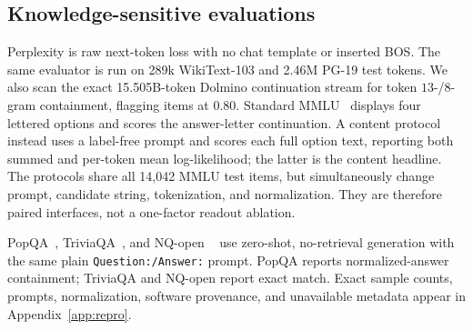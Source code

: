 \subsection{Knowledge-sensitive evaluations}
Perplexity is raw next-token loss with no chat template or inserted BOS.
The same evaluator is run on 289k WikiText-103 and 2.46M PG-19 test tokens.
We also scan the exact 15.505B-token Dolmino continuation stream for token
$13$-/$8$-gram containment, flagging items at 0.80.
Standard MMLU~\citep{hendrycks2021mmlu} displays four lettered options and
scores the answer-letter continuation. A content protocol instead uses a
label-free prompt and scores each full option text, reporting both summed and
per-token mean log-likelihood; the latter is the content headline. The
protocols share all 14,042 MMLU test items, but simultaneously change prompt,
candidate string, tokenization, and normalization. They are therefore paired
interfaces, not a one-factor readout ablation.

PopQA~\citep{mallen2023popqa}, TriviaQA~\citep{joshi2017triviaqa}, and NQ-open
~\citep{kwiatkowski2019natural} use zero-shot, no-retrieval generation with the
same plain \texttt{Question:/Answer:} prompt. PopQA reports normalized-answer
containment; TriviaQA and NQ-open report exact match. Exact sample counts,
prompts, normalization, software provenance, and unavailable metadata appear
in Appendix~\ref{app:repro}.
